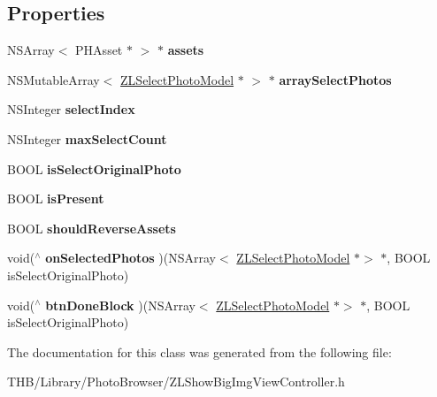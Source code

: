 \subsection*{Properties}
\begin{DoxyCompactItemize}
\item 
\mbox{\label{interface_z_l_show_big_img_view_controller_ab00a55aca68950ce88bfb6ecb8383e59}} 
N\+S\+Array$<$ P\+H\+Asset $\ast$ $>$ $\ast$ {\bfseries assets}
\item 
\mbox{\label{interface_z_l_show_big_img_view_controller_ac4916c3e21c79c2e20124b8d2889152c}} 
N\+S\+Mutable\+Array$<$ \mbox{\hyperlink{interface_z_l_select_photo_model}{Z\+L\+Select\+Photo\+Model}} $\ast$ $>$ $\ast$ {\bfseries array\+Select\+Photos}
\item 
\mbox{\label{interface_z_l_show_big_img_view_controller_af3f3cc5d4fc452f23448f10ae26fbc8d}} 
N\+S\+Integer {\bfseries select\+Index}
\item 
\mbox{\label{interface_z_l_show_big_img_view_controller_a253e1e1ffb8dc52f57f347bce602c6f4}} 
N\+S\+Integer {\bfseries max\+Select\+Count}
\item 
\mbox{\label{interface_z_l_show_big_img_view_controller_aebd4e5bbe1b52e75c5f1c9ac8fe0f21e}} 
B\+O\+OL {\bfseries is\+Select\+Original\+Photo}
\item 
\mbox{\label{interface_z_l_show_big_img_view_controller_af905df9ea5bafeeb5f809d0f1e3a71f5}} 
B\+O\+OL {\bfseries is\+Present}
\item 
\mbox{\label{interface_z_l_show_big_img_view_controller_a9be2bc6d451477e97371ef4e0479765b}} 
B\+O\+OL {\bfseries should\+Reverse\+Assets}
\item 
\mbox{\label{interface_z_l_show_big_img_view_controller_ab962c8813a0156dd9b7644dcea03b7a6}} 
void($^\wedge$ {\bfseries on\+Selected\+Photos} )(N\+S\+Array$<$ \mbox{\hyperlink{interface_z_l_select_photo_model}{Z\+L\+Select\+Photo\+Model}} $\ast$$>$ $\ast$, B\+O\+OL is\+Select\+Original\+Photo)
\item 
\mbox{\label{interface_z_l_show_big_img_view_controller_a6873cb75b98029e154ef05708533f8c9}} 
void($^\wedge$ {\bfseries btn\+Done\+Block} )(N\+S\+Array$<$ \mbox{\hyperlink{interface_z_l_select_photo_model}{Z\+L\+Select\+Photo\+Model}} $\ast$$>$ $\ast$, B\+O\+OL is\+Select\+Original\+Photo)
\end{DoxyCompactItemize}


The documentation for this class was generated from the following file\+:\begin{DoxyCompactItemize}
\item 
T\+H\+B/\+Library/\+Photo\+Browser/Z\+L\+Show\+Big\+Img\+View\+Controller.\+h\end{DoxyCompactItemize}
